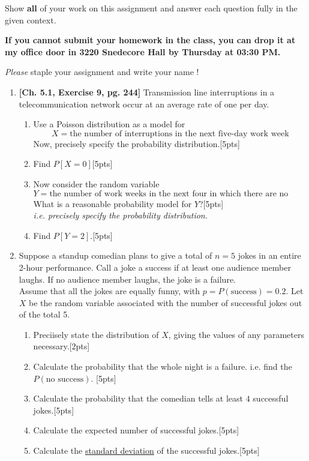 \documentclass[11pt]{article}\usepackage[]{graphicx}\usepackage[]{color}
\begin{document}

\pagestyle{fancy} 

Show \textbf{all} of your work on this assignment and answer each question fully in the given context. 

\vspace{0.3cm}

\textbf{If you cannot submit your homework in the class, you can drop it at my office door in 3220 Snedecore Hall by Thursday at 03:30 PM.}

\vspace{0.3cm}

\emph{Please} staple your assignment and write your name !

\begin{enumerate}
	
  \item \textbf{[Ch. 5.1, Exercise 9, pg. 244]} Transmission line interruptions in a telecommunication network occur at an average rate of one per day.
    \begin{enumerate}
      \item Use a Poisson distribution as a model for
        $$
        X = \text{the number of interruptions in the next five-day work week}
        $$
      Now, precisely specify the probability distribution.[5pts]
      \item Find $P[X = 0]$[5pts]
      \item Now consider the random variable
        $$
        Y = \text{the number of work weeks in the next four in which there are no interruptions}
        $$
        What is a reasonable probability model for $Y$?[5pts]\\
        \emph{i.e. precisely specify the probability distribution.}
        
      \item Find $P[Y = 2]$.[5pts]
	\end{enumerate}
	\item Suppose a standup comedian plans to give a total of $n=5$ jokes in an entire 2-hour performance. Call a joke a success if at least one audience member laughs. If no audience member laughs, the joke is a failure.\\
	Assume that all the jokes are equally funny, with $p= P(\text{success}) = 0.2$. Let $X$ be the random variable associated with the number of successful jokes out of the total 5. 
	\begin{enumerate}
	  \item Preciisely state the distribution of $X$, giving the values of any parameters necessary.[2pts]
	  \item Calculate the probability that the whole night is a failure. i.e. find the $P(\text{no success})$. [5pts]
	  \item Calculate the probability that the comedian tells at least $4$ successful jokes.[5pts]
	  \item Calculate the expected number of successful jokes.[5pts]
	  \item Calculate the \underline{standard deviation} of the successful jokes.[5pts]
	  

\end{enumerate}
\end{enumerate}
\end{document}
